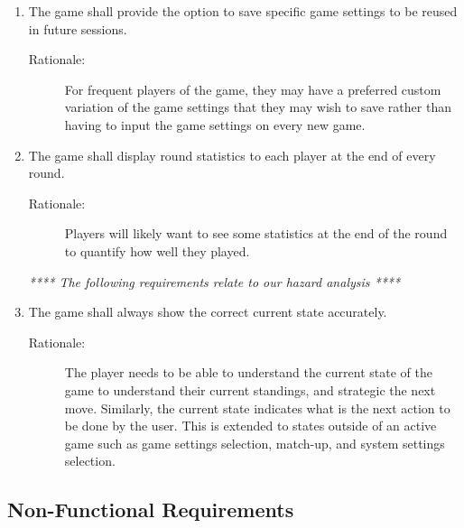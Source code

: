 \begin{enumerate}[label=R\arabic*, start=1, left=0pt]
    \item \label{R15} The game shall provide the option to save specific game settings to be reused in future sessions.
    \begin{description}
        \item[Rationale:] For frequent players of the game, they may have a preferred custom variation of the game settings that they may wish to save rather than having to input the game settings on every new game.
    \end{description}

    \item \label{R16} The game shall display round statistics to each player at the end of every round.
    \begin{description}
        \item[Rationale:] Players will likely want to see some statistics at the end of the round to quantify how well they played.
    \end{description}

    \textit{**** The following requirements relate to our hazard analysis ****}
    \item \label{R17} The game shall always show the correct current state accurately.
    \begin{description}
        \item[Rationale:] The player needs to be able to understand the current state of the game to understand their current standings, and strategic the next move. Similarly, the current state indicates what is the next action to be done by the user. This is extended to states outside of an active game such as game settings selection, match-up, and system settings selection.
    \end{description}

\end{enumerate}

\subsection{Non-Functional Requirements}


